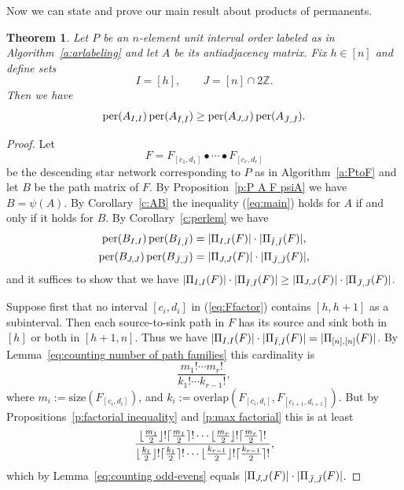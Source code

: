 \documentclass[12pt]{amsart}
\DeclarePairedDelimiter\ceil{\lceil}{\rceil}
\DeclarePairedDelimiter\floor{\lfloor}{\rfloor}
\newtheorem{thm}{Theorem}[section]
\theoremstyle{definition}
\numberwithin{equation}{section}
\newcommand{\defeq}{:=}
\DeclareMathOperator{\perm}{per}
\begin{document}
Now we can state and prove our main result about products of permanents.

\begin{thm}\label{t:main}
Let $P$ be an $n$-element unit interval order
labeled as in Algorithm~\ref{a:arlabeling}
and let $A$ be its antiadjacency matrix.
  Fix $h \in [n]$ and define sets
  \begin{equation*}
      I = [h] ,\qquad
      J = [n] \cap 2 \mathbb Z.
  \end{equation*}
  Then we have
  \begin{equation}\label{eq:main}
    \perm(A_{I,I})\perm(A_{\Bar I, \Bar I}) \geq \perm(A_{J,J})\perm(A_{\Bar J, \Bar J}).
  \end{equation}
  \end{thm}

\begin{proof}
Let
\begin{equation}\label{eq:Ffactor}
F = F_{[c_1,d_1]} \bullet \cdots \bullet F_{[c_r,d_r]}
\end{equation}
be the descending star network corresponding to $P$
as in Algorithm~\ref{a:PtoF}
and let $B$ be the path matrix of $F$.
By Proposition~\ref{p:P A F psiA}
we have $B = \psi(A)$.
By Corollary~\ref{c:AB}
the inequality (\ref{eq:main}) holds for $A$ if and only if
it holds for $B$.
By Corollary~\ref{c:perlem} we have
\begin{equation}
    \begin{gathered}
      \perm(B_{I,I}) \perm(B_{\Bar I,\Bar I}) =
      | \Pi_{I,I}(F)| \cdot |\Pi_{\Bar I,\Bar I}(F) |,\\
     \perm(B_{J,J}) \perm(B_{\Bar J,\Bar J}) =
     |\Pi_{J,J}(F) | \cdot | \Pi_{\Bar J,\Bar J}(F) |,
     \end{gathered}
     \end{equation}
and it suffices to show that we have
$|\Pi_{I,I}(F)|\cdot |\Pi_{\Bar I, \Bar I}(F)| \geq |\Pi_{J,J}(F)|\cdot |\Pi_{\Bar J, \Bar J}(F)|$.

Suppose first that no interval
$[c_i,d_i]$ in
(\ref{eq:Ffactor})
contains $[h,h+1]$ as a subinterval.
Then each source-to-sink path in $F$ has its
source and sink both in $[h]$ or both in $[h+1,n]$. Thus we have
$|\Pi_{I,I}(F)| \cdot |\Pi_{\Bar I, \Bar I}(F)| = |\Pi_{[n],[n]}(F)|$.
By Lemma~\ref{eq:counting number of path families}
this cardinality is
\begin{equation}\label{eq:mkratio}
 \frac{m_1! \cdots m_r!}{ k_1! \cdots k_{r-1}!},
\end{equation}
where
    $m_i \defeq \text{size}(F_{[c_i,d_i]})$,
and
$k_i \defeq \text{overlap}(F_{[c_i,d_i]},F_{[c_{i+1},d_{i+1}]})$.
But by Propositions~\ref{p:factorial inequality} and \ref{p:max factorial} this is at least
\begin{equation*}
    \frac{\floor{\tfrac{m_1}{2}}!\ceil{\tfrac{m_1}{2}}! \cdots  \floor{\tfrac{m_r}{2}}!\ceil{\tfrac{m_r}{2}}!}
     {\floor{\tfrac{k_1}{2}}!\ceil{\tfrac{k_1}{2}}! \cdots \floor{\tfrac{k_{r-1}}{2}}!\ceil{\tfrac{k_{r-1}}{2}}!},
     \end{equation*}
     which by Lemma~\ref{eq:counting odd-evens}
     equals
    $|\Pi_{J,J}(F) | \cdot |\Pi_{\Bar{J},\Bar{J}}(F)|$.


\end{proof}
\end{document}
